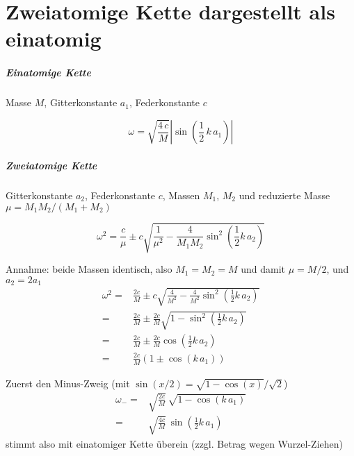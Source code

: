 


\chapter{Zweiatomige Kette dargestellt als einatomig}



\paragraph{Einatomige  Kette} Masse $M$, Gitterkonstante $a_1$, Federkonstante $c$


\begin{equation}
\omega = \sqrt{\frac{4 \, c}{M}} \left| \sin \left(\frac{1}{2} \,  k \, a_1  \right) \right|
\end{equation}




\paragraph{Zweiatomige  Kette}  Gitterkonstante $a_2$, Federkonstante $c$, Massen $M_1$, $M_2$ und reduzierte Masse $\mu = M_1 M_2 / (M_1 + M_2)$

\begin{equation}
\omega^2 =  \frac{c}{\mu}
\pm c \sqrt{ \frac{1}{\mu^2} - \frac{4}{M_1 M_2}  \sin^2 \left( \frac{1}{2}  k \, a_2 \right) } 
\end{equation}

Annahme: beide Massen identisch, also $M_1 = M_2 = M$ und damit $\mu = M/2$, und $a_2 = 2 a_1$
\begin{align}
\omega^2 =  & \frac{2c}{M}
\pm c \sqrt{ \frac{4}{M^2} - \frac{4}{M^2}  \sin^2 \left( \frac{1}{2}  k \, a_2 \right) }  \\
= &\frac{2c}{M}
\pm \frac{2c}{M} \sqrt{ 1 -   \sin^2 \left( \frac{1}{2}  k \, a_2 \right) }  \\
= &\frac{2c}{M}
\pm \frac{2c}{M}   \cos \left( \frac{1}{2}  k \, a_2 \right)   \\
= &\frac{2c}{M} \left( 1 
\pm   \cos \left(   k \, a_1 \right)    \right)
\end{align}

Zuerst den Minus-Zweig (mit $\sin(x/2) = \sqrt{ 1-\cos(x) } / \sqrt{2}$)
\begin{align}
\omega_{-} =  & \sqrt{\frac{2c}{M}} \, \sqrt{1 - 
  \cos \left(   k \, a_1 \right) }  \\
=  & \sqrt{\frac{4c}{M}} \, 
  \sin \left( \frac{1}{2}   k \, a_1 \right) 
\end{align}
stimmt also mit einatomiger Kette überein (zzgl. Betrag wegen Wurzel-Ziehen)

